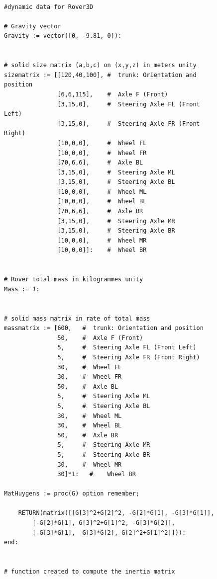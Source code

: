 \begin{figure}[H]
\begin{minipage}[t]{.6\linewidth}
\begin{center}
\begin{tiny}
\begin{verbatim}

#dynamic data for Rover3D

# Gravity vector
Gravity := vector([0, -9.81, 0]):


# solid size matrix (a,b,c) on (x,y,z) in meters unity
sizematrix := [[120,40,100], #  trunk: Orientation and position
               [6,6,115],    #  Axle F (Front) 			
               [3,15,0],     #	Steering Axle FL (Front Left)	
               [3,15,0],     #  Steering Axle FR (Front Right)	
               [10,0,0],     #  Wheel FL		
               [10,0,0],     #  Wheel FR			
               [70,6,6],     #  Axle BL				
               [3,15,0],     #  Steering Axle ML  		
               [3,15,0],     #  Steering Axle BL  	
               [10,0,0],     #  Wheel ML 			
               [10,0,0],     #  Wheel BL 			
               [70,6,6],     #  Axle BR
               [3,15,0],     #  Steering Axle MR 		
               [3,15,0],     #  Steering Axle BR 		
               [10,0,0],     #  Wheel MR       			
               [10,0,0]]:    #	Wheel BR       			


# Rover total mass in kilogrammes unity
Mass := 1:	


# solid mass matrix in rate of total mass
massmatrix := [600,   #  trunk: Orientation and position
               50,    #  Axle F (Front)
               5,     #	 Steering Axle FL (Front Left)
               5,     #  Steering Axle FR (Front Right)
               30,    #  Wheel FL
               30,    #  Wheel FR
               50,    #  Axle BL
               5,     #  Steering Axle ML 
               5,     #  Steering Axle BL 
               30,    #  Wheel ML
               30,    #  Wheel BL 
               50,    #  Axle BR
               5,     #  Steering Axle MR 
               5,     #  Steering Axle BR 
               30,    #  Wheel MR 
               30]*1:   #	 Wheel BR 

MatHuygens := proc(G) option remember;

	RETURN(matrix([[G[3]^2+G[2]^2, -G[2]*G[1], -G[3]*G[1]],
		[-G[2]*G[1], G[3]^2+G[1]^2, -G[3]*G[2]],
		[-G[3]*G[1], -G[3]*G[2], G[2]^2+G[1]^2]])):
end:


# function created to compute the inertia matrix


\end{verbatim}
\end{tiny}
\end{center}
\end{minipage}
\end{figure}
